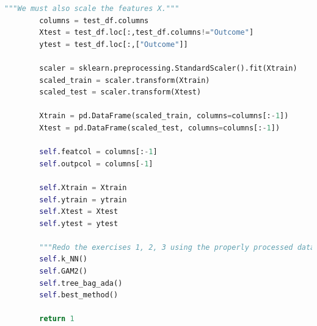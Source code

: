 \documentclass[]{article}
\begin{document}
\begin{lstlisting}[language=Python]
		"""We must also scale the features X."""
		columns = test_df.columns
		Xtest = test_df.loc[:,test_df.columns!="Outcome"]
		ytest = test_df.loc[:,["Outcome"]]
		
		scaler = sklearn.preprocessing.StandardScaler().fit(Xtrain)
		scaled_train = scaler.transform(Xtrain)
		scaled_test = scaler.transform(Xtest)
		
		Xtrain = pd.DataFrame(scaled_train, columns=columns[:-1])
		Xtest = pd.DataFrame(scaled_test, columns=columns[:-1])
		
		self.featcol = columns[:-1]
		self.outpcol = columns[-1]
		
		self.Xtrain = Xtrain
		self.ytrain = ytrain
		self.Xtest = Xtest
		self.ytest = ytest
		
		"""Redo the exercises 1, 2, 3 using the properly processed data."""
		self.k_NN()
		self.GAM2()
		self.tree_bag_ada()
		self.best_method()
		
		return 1
		
\end{lstlisting}
\end{document}
